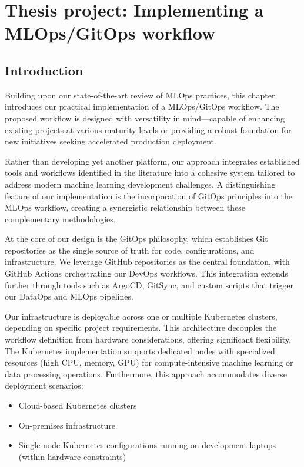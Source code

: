 \chapter{Thesis project: Implementing a MLOps/GitOps workflow}\label{ch:thesis-project:-a-standard-mlops-ci/cd-workflow}
\section{Introduction}\label{sec:introduction}
Building upon our state-of-the-art review of MLOps practices, this chapter introduces our practical implementation of a MLOps/GitOps workflow.
The proposed workflow is designed with versatility in mind—capable of enhancing existing projects at various maturity levels or providing a robust foundation for new initiatives seeking accelerated production deployment.

Rather than developing yet another platform, our approach integrates established tools and workflows identified in the literature into a cohesive system tailored to address modern machine learning development challenges.
A distinguishing feature of our implementation is the incorporation of GitOps principles into the MLOps workflow, creating a synergistic relationship between these complementary methodologies.

At the core of our design is the GitOps philosophy, which establishes Git repositories as the single source of truth for code, configurations, and infrastructure.
We leverage GitHub repositories as the central foundation, with GitHub Actions orchestrating our DevOps workflows.
This integration extends further through tools such as ArgoCD, GitSync, and custom scripts that trigger our DataOps and MLOps pipelines. %

Our infrastructure is deployable across one or multiple Kubernetes clusters, depending on specific project requirements.
This architecture decouples the workflow definition from hardware considerations, offering significant flexibility.
The Kubernetes implementation supports dedicated nodes with specialized resources (high CPU, memory, GPU) for compute-intensive machine learning or data processing operations.
Furthermore, this approach accommodates diverse deployment scenarios:

\begin{itemize}
\item Cloud-based Kubernetes clusters
\item On-premises infrastructure
\item Single-node Kubernetes configurations running on development laptops (within hardware constraints)
\end{itemize}

